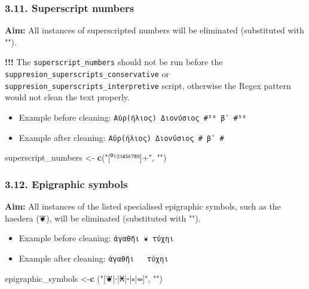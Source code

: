 \documentclass[]{article}
\newenvironment{Shaded}{\begin{snugshade}}{\end{snugshade}}
\newcommand{\KeywordTok}[1]{\textcolor[rgb]{0.13,0.29,0.53}{\textbf{#1}}}
\newcommand{\NormalTok}[1]{#1}
\newcommand{\StringTok}[1]{\textcolor[rgb]{0.31,0.60,0.02}{#1}}
\providecommand{\tightlist}{%
  \setlength{\itemsep}{0pt}\setlength{\parskip}{0pt}}
\begin{document}
\hypertarget{superscript-numbers}{%
\subsubsection{3.11. Superscript numbers}\label{superscript-numbers}}

\textbf{Aim:} All instances of superscripted numbers will be eliminated
(substituted with "").

\textbf{!!!} The \texttt{superscript\_numbers} should not be run before
the \texttt{suppresion\_superscripts\_conservative} or
\texttt{suppresion\_superscripts\_interpretive} script, otherwise the
Regex pattern would not clean the text properly.

\begin{itemize}
\tightlist
\item
  Example before cleaning:
  \texttt{Αὐρ(ήλιος)\ Διονύσιος\ \#⁵⁶\ βʹ\ \#⁵⁶}
\item
  Example after cleaning: \texttt{Αὐρ(ήλιος)\ Διονύσιος\ \#\ βʹ\ \#}
\end{itemize}

\begin{Shaded}
\begin{Highlighting}[]
\NormalTok{superscript_numbers <-}\StringTok{ }\KeywordTok{c}\NormalTok{(}\StringTok{"[⁰¹²³⁴⁵⁶⁷⁸⁹]+"}\NormalTok{, }\StringTok{""}\NormalTok{)}
\end{Highlighting}
\end{Shaded}

\hypertarget{epigraphic-symbols}{%
\subsubsection{3.12. Epigraphic symbols}\label{epigraphic-symbols}}

\textbf{Aim:} All instances of the listed specialised epigraphic
symbols, such as the haedera (❦), will be eliminated (substituted with
"").

\begin{itemize}
\tightlist
\item
  Example before cleaning: \texttt{ἀγαθῆι\ ❦\ τύχηι}
\item
  Example after cleaning: \texttt{ἀγαθῆι\ \ \ τύχηι}
\end{itemize}

\begin{Shaded}
\begin{Highlighting}[]
\NormalTok{epigraphic_symbols <-}\KeywordTok{c}\NormalTok{ (}\StringTok{"[❦|∙|𐆖|⏑|⏓|⏕]"}\NormalTok{, }\StringTok{""}\NormalTok{)}
\end{Highlighting}
\end{Shaded}
\end{document}
